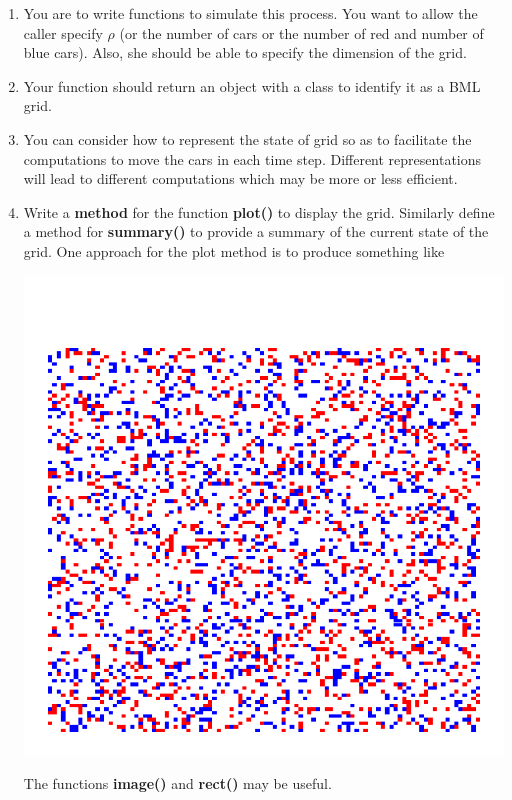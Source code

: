 \documentclass{article}
\def\Rfunc#1{\textbf{#1()}}
\begin{document}
\begin{enumerate}

 \item You are to write functions  to simulate this process.
   You want to allow the  caller specify $\rho$ (or the number of cars
   or the number of red and number of blue cars).
   Also, she should be able to specify the dimension of the grid.
  
 \item Your function should return an object with a class to identify it as a BML grid.

 \item You can consider how to represent the state of grid so as to facilitate
   the computations to move the cars in each time step. Different representations
   will lead to different computations which  may be more or less efficient.

 \item Write a \textbf{method} for the function \Rfunc{plot} to
   display the grid. Similarly define a method for \Rfunc{summary} to 
   provide a summary of the current state of the grid.
   One approach for the plot method is to produce something like
  \begin{center}
\includegraphics{bmlGrid.pdf}    
  \end{center}
   The functions \Rfunc{image} and \Rfunc{rect} may be useful.


\end{enumerate}
\end{document}
